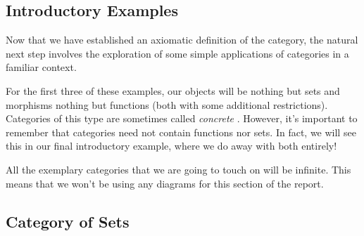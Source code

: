 %
%
\setlength{\jot}{5pt}
\subsection{Introductory Examples}

Now that we have established an axiomatic definition of the category, the
natural next step involves the exploration of some simple applications of
categories in a familiar context.

For the first three of these examples, our objects will be
nothing but sets and morphisms nothing but functions (both with some additional
restrictions). Categories of this type are sometimes called
\emph{concrete} \autocite{Awodey:2010}.
However, it's important to remember that categories need not
contain functions nor sets. In fact, we will see this in our final introductory
example, where we do away with both entirely!

All the exemplary categories that we are going to touch on will be infinite.
This means that we won't be using any diagrams for this section of the report.

\subsection{Category of Sets}

